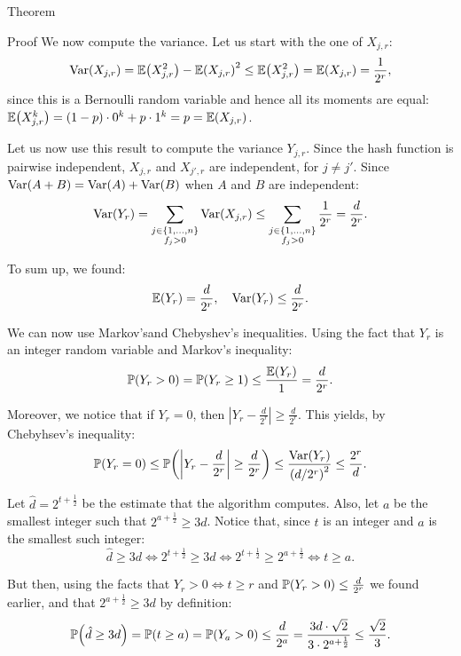 \documentclass[a4paper]{article}
\begin{document}
\begin{parag}{Theorem}
\begin{subparag}{Proof}
        We now compute the variance. Let us start with the one of $X_{j, r}$: 
        \[\Var\left(X_{j, r}\right) = \exval\left(X_{j, r}^2\right) - \exval\left(X_{j, r}\right)^2 \leq \exval\left(X_{j, r}^2\right) = \exval\left(X_{j, r}\right) = \frac{1}{2^r},\]
        since this is a Bernoulli random variable and hence all its moments are equal: $\exval\left(X_{j,r}^k\right) = \left(1-p\right)\cdot 0^k + p\cdot 1^k = p = \exval\left(X_{j, r}\right)$.

        Let us now use this result to compute the variance $Y_{j, r}$. Since the hash function is pairwise independent, $X_{j, r}$ and $X_{j', r}$ are independent, for $j \neq j'$. Since $\Var\left(A + B\right) = \Var\left(A\right) + \Var\left(B\right)$ when $A$ and $B$ are independent: 
        \[\Var\left(Y_r\right) = \sum_{\substack{j \in \left\{1, \ldots, n\right\} \\ f_j > 0}} \Var\left(X_{j, r}\right) \leq \sum_{\substack{j \in \left\{1, \ldots, n\right\} \\ f_j > 0}} \frac{1}{2^r} = \frac{d}{2^r}.\]

        To sum up, we found: 
        \[\exval\left(Y_r\right) = \frac{d}{2^r}, \mathspace \Var\left(Y_r\right) \leq \frac{d}{2^r}.\]
        
        We can now use Markov'sand Chebyshev's inequalities. Using the fact that $Y_r$ is an integer random variable and Markov's inequality: 
        \[\prob\left(Y_r > 0\right) = \prob\left(Y_r \geq 1\right) \leq \frac{\exval\left(Y_r\right)}{1} = \frac{d}{2^r}.\]

        Moreover, we notice that if $Y_r = 0$, then $\left|Y_r - \frac{d}{2^r}\right| \geq \frac{d}{2^r}$. This yields, by Chebyhsev's inequality:
        \[\prob\left(Y_r = 0\right) \leq \prob\left(\left|Y_r - \frac{d}{2^r}\right| \geq \frac{d}{2^r}\right) \leq \frac{\Var\left(Y_r\right)}{\left(d/2^r\right)^2} \leq \frac{2^r}{d}.\]
        
        Let $\hat{d} = 2^{t + \frac{1}{2}}$ be the estimate that the algorithm computes. Also, let $a$ be the smallest integer such that $2^{a + \frac{1}{2}} \geq 3d$. Notice that, since $t$ is an integer and $a$ is the smallest such integer: 
        \[\hat{d} \geq 3d \iff 2^{t + \frac{1}{2}} \geq 3d \iff  2^{t + \frac{1}{2}} \geq 2^{a + \frac{1}{2}} \iff t \geq a.\]
        
        But then, using the facts that $Y_r > 0 \iff t \geq r$ and $\prob\left(Y_r > 0\right) \leq \frac{d}{2^r}$ we found earlier, and that $2^{a + \frac{1}{2}} \geq 3d$ by definition: 
        \[\prob\left(\hat{d} \geq 3d\right) = \prob\left(t \geq a\right) = \prob\left(Y_a > 0\right) \leq \frac{d}{2^a} = \frac{3 d\cdot \sqrt{2}}{3\cdot 2^{a + \frac{1}{2}}} \leq \frac{\sqrt{2}}{3}.\]


\end{subparag}
\end{parag}
\end{document}
